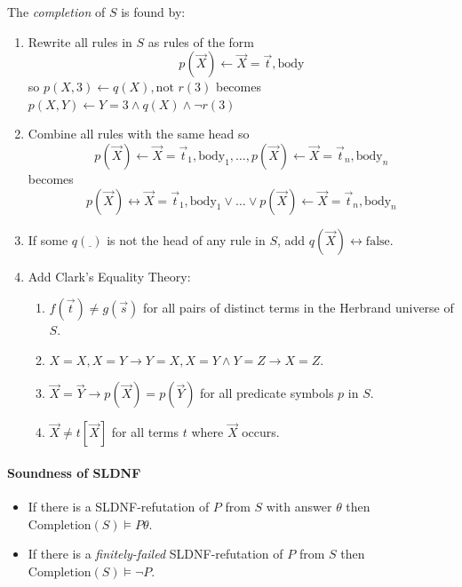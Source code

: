 \documentclass[twocolumn,english]{article}
\begin{document}
The \emph{completion} of $S$ is found by:
\begin{enumerate}
\item Rewrite all rules in $S$ as rules of the form
\[
p\left(\overrightarrow{X}\right)\leftarrow\overrightarrow{X}=\overrightarrow{t},\text{body}
\]
so $p\left(X,3\right)\leftarrow q\left(X\right),\text{not }r\left(3\right)$
becomes $p\left(X,Y\right)\leftarrow Y=3\land q\left(X\right)\land\lnot r\left(3\right)$
\item Combine all rules with the same head so 
\[
p\left(\overrightarrow{X}\right)\leftarrow\overrightarrow{X}=\overrightarrow{t}_{1},\text{body}_{1},\dots,p\left(\overrightarrow{X}\right)\leftarrow\overrightarrow{X}=\overrightarrow{t}_{n},\text{body}_{n}
\]
becomes
\[
p\left(\overrightarrow{X}\right)\leftrightarrow\overrightarrow{X}=\overrightarrow{t}_{1},\text{body}_{1}\lor\dots\lor p\left(\overrightarrow{X}\right)\leftarrow\overrightarrow{X}=\overrightarrow{t}_{n},\text{body}_{n}
\]
\item If some $q\left(\underline{\;}\right)$ is not the head of any rule
in $S$, add $q\left(\overrightarrow{X}\right)\leftrightarrow\text{false}$.
\item Add Clark's Equality Theory:
\begin{enumerate}
\item $f\left(\overrightarrow{t}\right)\neq g\left(\overrightarrow{s}\right)$
for all pairs of distinct terms in the Herbrand universe of $S$.
\item $X=X,X=Y\rightarrow Y=X,X=Y\land Y=Z\rightarrow X=Z$.
\item $\overrightarrow{X}=\overrightarrow{Y}\rightarrow p\left(\overrightarrow{X}\right)=p\left(\overrightarrow{Y}\right)$
for all predicate symbols $p$ in $S$.
\item $\overrightarrow{X}\neq t\left[\overrightarrow{X}\right]$ for all
terms $t$ where $\overrightarrow{X}$ occurs.
\end{enumerate}
\end{enumerate}

\paragraph{Soundness of SLDNF}
\begin{itemize}
\item If there is a SLDNF-refutation of $P$ from $S$ with answer $\theta$
then $\text{Completion}\left(S\right)\vDash P\theta$.
\item If there is a \emph{finitely-failed} SLDNF-refutation of $P$ from
$S$ then $\text{Completion}\left(S\right)\vDash\lnot P$.
\end{itemize}
\end{document}
